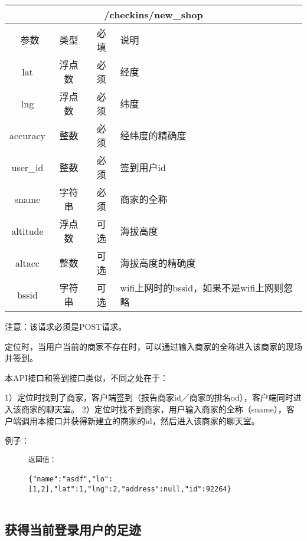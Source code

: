 \documentclass[cs4size]{ctexartutf8}
\begin{document}
\begin{table}[H]
   \begin{center}
\begin{tabular}{|c|c|c|p{12cm}|}
\hline
\multicolumn{4}{|c|}{/checkins/new\_shop} \\
\hline\hline
 \  参数  & 类型 & 必填 &  说明  \\
\hline
 lat  & 浮点数 & 必须 & 经度\\
\hline
 lng  &  浮点数 & 必须 & 纬度\\ 
\hline
 accuracy  & 整数 & 必须 & 经纬度的精确度\\ 
\hline
 user\_id  & 整数 & 必须 &  签到用户id\\ 
\hline
 sname  & 字符串 & 必须 &  商家的全称\\  
\hline
 altitude  &  浮点数 & 可选 & 海拔高度\\ 
\hline
 altacc  & 整数 & 可选 & 海拔高度的精确度\\  
\hline
 bssid  & 字符串 & 可选 & wifi上网时的bssid，如果不是wifi上网则忽略\\  
\hline
\end{tabular}
   \end{center}
\end{table}

注意：该请求必须是POST请求。

定位时，当用户当前的商家不存在时，可以通过输入商家的全称进入该商家的现场并签到。

本API接口和签到接口类似，不同之处在于：

1）定位时找到了商家，客户端签到（报告商家id／商家的排名od），客户端同时进入该商家的聊天室。
2）定位时找不到商家，用户输入商家的全称（sname），客户端调用本接口并获得新建立的商家的id，然后进入该商家的聊天室。


例子：

\begin{figure}[H]
\begin{verbatim}
返回值：

{"name":"asdf","lo":[1,2],"lat":1,"lng":2,"address":null,"id":92264}


\end{verbatim}
\end{figure}



\subsection{获得当前登录用户的足迹}
\end{document}
